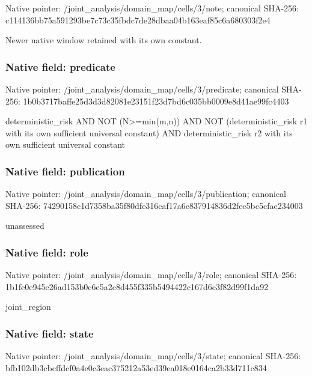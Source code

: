 \documentclass[10pt,a4paper]{article}
\begin{document}
Native pointer: /joint\_analysis/domain\_map/cells/3/note; canonical SHA-256: c114136bb75a591293be7c73\allowbreak{}c35fbdc7de28dbaa04b163ea\allowbreak{}f85c6a680303f2e4


Newer native window retained with its own constant.


\subsubsection{Native field: predicate}


Native pointer: /joint\_analysis/domain\_m\allowbreak{}ap/cells/3/predicate; canonical SHA-256: 1b0b3717baffe25d3d3d8208\allowbreak{}1e23151f23d7bd6c035bb000\allowbreak{}9e8d41ae99fc4403


deterministic\_risk AND NOT (N>=min(m,n)) AND NOT (deterministic\_risk r1 with its own sufficient universal constant) AND deterministic\_risk r2 with its own sufficient universal constant


\subsubsection{Native field: publication}


Native pointer: /joint\_analysis/domain\_m\allowbreak{}ap/cells/3/publication; canonical SHA-256: 74290158c1d7358ba35f80df\allowbreak{}e316caf17a6c837914836d2f\allowbreak{}ec5bc5cfac234003


unassessed


\subsubsection{Native field: role}


Native pointer: /joint\_analysis/domain\_map/cells/3/role; canonical SHA-256: 1b1fe0e945e26ad153b0c6e5\allowbreak{}a2c8d455f335b5494422c167\allowbreak{}d6c3f82d99f1da92


joint\_region


\subsubsection{Native field: state}


Native pointer: /joint\_analysis/domain\_m\allowbreak{}ap/cells/3/state; canonical SHA-256: bfb102db3cbcffdcf0a4e0c3\allowbreak{}eac375212a53ed39ea018e01\allowbreak{}64ca2b33d711c834
\end{document}
